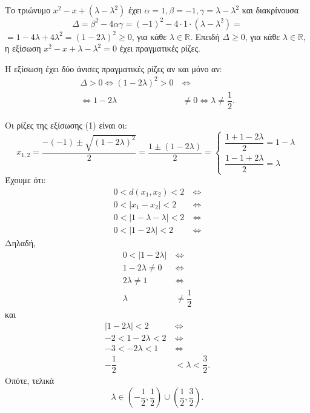 
\begin{alist}
\item Το τριώνυμο $x^2 - x + (\lambda - \lambda^2)$ έχει $\alpha = 1, \beta = -1, \gamma = \lambda - \lambda^2$ και διακρίνουσα
\[\Delta = \beta^2 - 4\alpha\gamma = (-1)^2 - 4 \cdot 1 \cdot (\lambda - \lambda^2) =\]
$= 1 - 4\lambda + 4\lambda^2 = (1 - 2\lambda)^2 \ge 0$, για κάθε $\lambda \in \mathbb{R}$.
Επειδή $\Delta \ge 0$, για κάθε $\lambda \in \mathbb{R}$, η εξίσωση $x^2 - x + \lambda - \lambda^2 = 0$ έχει πραγματικές ρίζες.

\item Η εξίσωση έχει δύο άνισες πραγματικές ρίζες αν και μόνο αν:
\begin{align*}
\Delta > 0 \Leftrightarrow (1 - 2\lambda)^2 > 0 \ &\Leftrightarrow \\
\Leftrightarrow 1 - 2\lambda &\ne 0 \Leftrightarrow \lambda \ne \dfrac{1}{2}.
\end{align*}

\item Οι ρίζες της εξίσωσης (1) είναι οι:
\[x_{1,2} = \dfrac{-(-1) \pm \sqrt{(1 - 2\lambda)^2}}{2} = \dfrac{1 \pm (1 - 2\lambda)}{2} = \begin{cases} \dfrac{1 + 1 - 2\lambda}{2} = 1 - \lambda \\ \dfrac{1 - 1 + 2\lambda}{2} = \lambda \end{cases}\]
Έχουμε ότι:
\begin{align*}
0 < d(x_1, x_2) < 2 \ &\Leftrightarrow \\
0 < |x_1 - x_2| < 2 \ &\Leftrightarrow \\
0 < |1 - \lambda - \lambda| < 2 \ &\Leftrightarrow \\
0 < |1 - 2\lambda| < 2 \ &\Leftrightarrow
\end{align*}
Δηλαδή,
\begin{align*}
0 < |1 - 2\lambda| \ &\Leftrightarrow \\
1 - 2\lambda \ne 0 \ &\Leftrightarrow \\
2\lambda \ne 1 \ &\Leftrightarrow \\
\lambda &\ne \dfrac{1}{2}
\end{align*}
και
\begin{align*}
|1 - 2\lambda| < 2 \ &\Leftrightarrow \\
-2 < 1 - 2\lambda < 2 \ &\Leftrightarrow \\
-3 < -2\lambda < 1 \ &\Leftrightarrow \\
-\dfrac{1}{2} &< \lambda < \dfrac{3}{2}.
\end{align*}
Οπότε, τελικά
\[\lambda \in \left(-\dfrac{1}{2}, \dfrac{1}{2}\right) \cup \left(\dfrac{1}{2}, \dfrac{3}{2}\right).\]
\end{alist}

